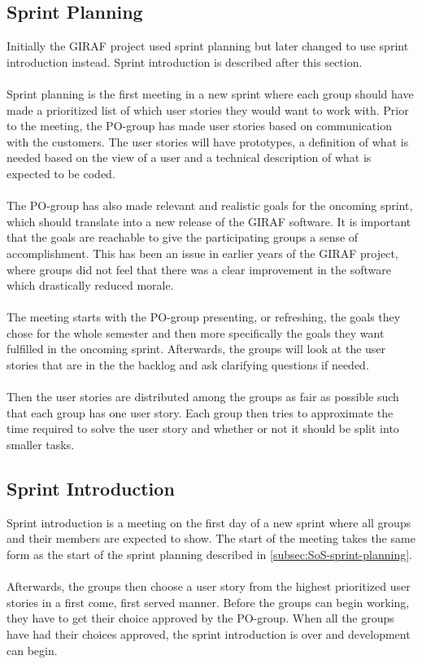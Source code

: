 \subsection{Sprint Planning} \label{subsec:SoS-sprint-planning}
Initially the GIRAF project used sprint planning but later changed to use sprint introduction instead.
Sprint introduction is described after this section.
\\
\\
Sprint planning is the first meeting in a new sprint where each group should have made a prioritized list of which user stories they would want to work with.
Prior to the meeting, the PO-group has made user stories based on communication with the customers.
The user stories will have prototypes, a definition of what is needed based on the view of a user and a technical description of what is expected to be coded.
\\
\\
The PO-group has also made relevant and realistic goals for the oncoming sprint, which should translate into a new release of the GIRAF software.
It is important that the goals are reachable to give the participating groups a sense of accomplishment.
This has been an issue in earlier years of the GIRAF project, where groups did not feel that there was a clear improvement in the software which drastically reduced morale.
\\
\\
The meeting starts with the PO-group presenting, or refreshing, the goals they chose for the whole semester and then more specifically the goals they want fulfilled in the oncoming sprint.
Afterwards, the groups will look at the user stories that are in the the backlog and ask clarifying questions if needed.
\\
\\
Then the user stories are distributed among the groups as fair as possible such that each group has one user story.
Each group then tries to approximate the time required to solve the user story and whether or not it should be split into smaller tasks.

\subsection{Sprint Introduction} \label{subsec:SoS-sprint-introduction}
Sprint introduction is a meeting on the first day of a new sprint where all groups and their members are expected to show. 
The start of the meeting takes the same form as the start of the sprint planning described in \autoref{subsec:SoS-sprint-planning}.
\\
\\
Afterwards, the groups then choose a user story from the highest prioritized user stories in a first come, first served manner.
Before the groups can begin working, they have to get their choice approved by the PO-group.
When all the groups have had their choices approved, the sprint introduction is over and development can begin.

